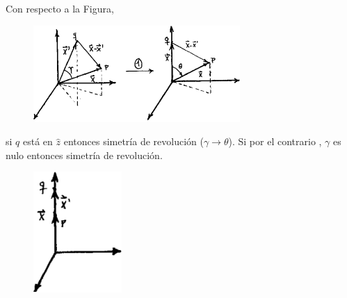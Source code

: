 \documentclass[10pt,oneside]{CBFT_book}
\begin{document}
Con respecto a la Figura, 

\begin{figure}[bht]
	\begin{center}
	\includegraphics[width=0.7\textwidth]{images/fig_ft1_armesf1.pdf}	 
	\end{center}
	\caption{}
\end{figure} 

si $q$ está en $\hat{z}$ entonces simetría de revolución ($\gamma \to \theta$). Si por el contrario ,
$\gamma $ es nulo entonces simetría de revolución.

\begin{figure}[tb]
	\begin{center}
	\includegraphics[width=0.3\textwidth]{images/fig_ft1_armesf2.pdf}	 
	\end{center}
	\caption{}
\end{figure} 
\end{document}
